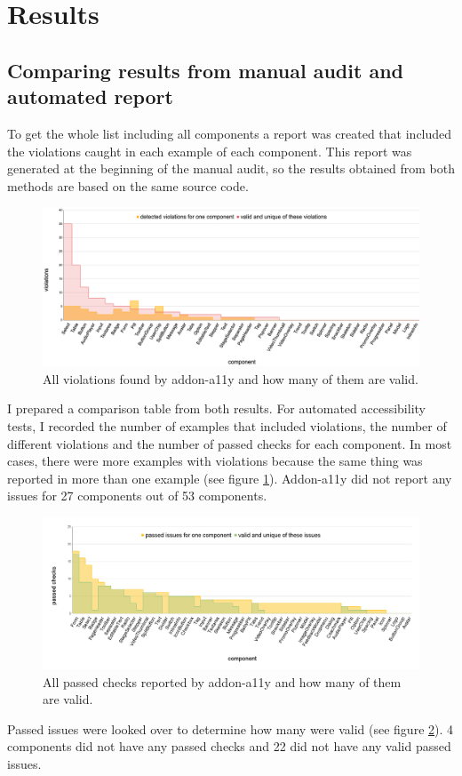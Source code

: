 \documentclass{master_thesis}
\begin{document}
\section{Results}


\subsection{Comparing results from manual audit and automated report}

To get the whole list including all components a report was created that included the violations caught in each example of each component. This report was generated at the beginning of the manual audit, so the results obtained from both methods are based on the same source code.
\begin{figure}[H]
	\includegraphics[width=\textwidth]{img/audit-failed.png}
	\caption{All violations found by addon-a11y and how many of them are valid.}
	\label{fig:audit-failed}
\end{figure}

I prepared a comparison table from both results. For automated accessibility tests, I recorded the number of examples that included violations, the number of different violations and the number of passed checks for each component. In most cases, there were more examples with violations because the same thing was reported in more than one example (see figure \ref{fig:audit-failed}). Addon-a11y did not report any issues for 27 components out of 53 components.

\begin{figure}[H]
	\includegraphics[width=\textwidth]{img/audit-passed.png}
	\caption{All passed checks reported by addon-a11y and how many of them are valid. }
	\label{fig:audit-passed}
\end{figure}
Passed issues were looked over to determine how many were valid (see figure \ref{fig:audit-passed}). 4 components did not have any passed checks and 22 did not have any valid passed issues.
\end{document}
